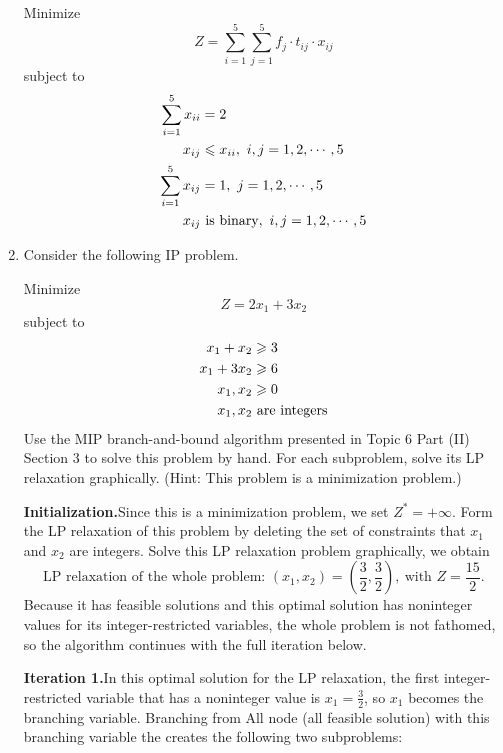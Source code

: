 \documentclass[a4paper]{article}
\begin{document}
\begin{enumerate}
\begin{solution}
	Minimize $$Z=\sum_{i=1}^{5}\sum_{j=1}^{5}f_j\cdot t_{ij}\cdot x_{ij}$$
	subject to
	\begin{equation*}
	\begin{aligned}
	\sum_{i=1}^{5} x_{ii}&=2\\
	x_{ij}&\leqslant x_{ii},\ i,j=1,2,\cdots,5\\
	\sum_{i=1}^{5}x_{ij}&=1,\ j=1,2,\cdots,5\\
	x_{ij} &\text{ is binary},\ i,j=1,2,\cdots,5\\
	\end{aligned}
	\end{equation*}
	
\end{solution}

\item Consider the following IP problem.

Minimize $$Z=2x_1+3x_2$$
subject to
\begin{equation*}
\begin{aligned}
x_1+x_2&\geqslant 3\\
x_1+3x_2&\geqslant 6\\
x_1,x_2&\geqslant 0\\
x_1,x_2&\text{ are integers}
\end{aligned}
\end{equation*}
Use the MIP branch-and-bound algorithm presented in Topic 6 Part (II) Section 3 to solve this problem by hand. For each subproblem, solve its LP relaxation graphically. (Hint: This problem is a minimization problem.)
\begin{solution}
	
	 \textbf{Initialization.}\quad Since this is a minimization problem, we set $Z^*=+\infty$. Form the LP relaxation of this problem by deleting the set of constraints that $x_1$ and $x_2$ are integers. Solve this LP relaxation problem graphically, we obtain
	\begin{equation*}
	\text{LP relaxation of the whole problem: } (x_1,x_2)=\left(\dfrac{3}{2},\dfrac{3}{2}\right),\ \text{with } Z=\dfrac{15}{2}.
	\end{equation*}
	Because it has feasible solutions and this optimal solution has noninteger values for its integer-restricted variables, the whole problem is not fathomed, so the algorithm continues with the full iteration below.
	
	\textbf{Iteration 1.}\quad In this optimal solution for the LP relaxation, the first integer-restricted variable that has a noninteger value is $x_1=\tfrac{3}{2}$, so $x_1$ becomes the branching variable. Branching from All node (all feasible solution) with this branching variable the creates the following two subproblems:
	

\end{solution}
\end{enumerate}
\end{document}
